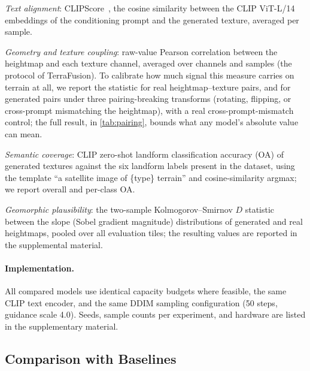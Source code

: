 \documentclass[review]{vgtc}                 %
\begin{document}
\emph{Text alignment}: CLIPScore~\cite{hessel2021clipscore}, the cosine similarity between the CLIP ViT-L/14
embeddings of the conditioning prompt and the generated texture, averaged per sample.

\emph{Geometry and texture coupling}: raw-value Pearson correlation between the heightmap
and each texture channel, averaged over channels and samples (the protocol of
TerraFusion). To calibrate how much signal this measure carries on terrain at all, we
report the statistic for real heightmap--texture pairs, and for generated pairs under
three pairing-breaking transforms (rotating, flipping, or cross-prompt mismatching
the heightmap), with a real cross-prompt-mismatch control; the full result, in
\cref{tab:pairing}, bounds what any model's absolute value can mean.

\emph{Semantic coverage}: CLIP zero-shot landform classification accuracy (OA) of
generated textures against the six landform labels present in the dataset, using the
template ``a satellite image of \{type\} terrain'' and cosine-similarity argmax; we
report overall and per-class OA.

\emph{Geomorphic plausibility}: the two-sample Kolmogorov--Smirnov $D$ statistic
between the slope (Sobel gradient magnitude) distributions of generated and real
heightmaps, pooled over all evaluation tiles; the resulting values are reported in the supplemental material.

\paragraph{Implementation.}
All compared models use identical capacity budgets where feasible, the same CLIP text encoder, and the same DDIM sampling configuration (50 steps, guidance scale 4.0).
Seeds, sample counts per experiment, and hardware are listed in the supplementary material.

\subsection{Comparison with Baselines}
\label{sec:comparison}
\end{document}

